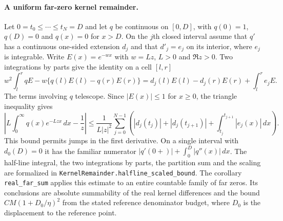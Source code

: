 \paragraph{A uniform far-zero kernel remainder.}
Let $0=t_0\le\cdots\le t_N=D$ and let $q$ be continuous on
$[0,D]$, with $q(0)=1$, $q(D)=0$ and $q(x)=0$ for $x>D$.
On the $j$th closed interval assume that $q'$ has a continuous
one-sided extension $d_j$ and that $d'_j=e_j$ on its interior,
where $e_j$ is integrable. Write $E(x)=e^{-wx}$ with $w=Lz$,
$L>0$ and $\Re z>0$. Two integrations by parts give the identity
on a cell $[l,r]$
\[
 w^2\int_l^r qE-w\{q(l)E(l)-q(r)E(r)\}
   =d_j(l)E(l)-d_j(r)E(r)+\int_l^r e_j E.
\]
The terms involving $q$ telescope. Since $|E(x)|\le1$ for
$x\ge0$, the triangle inequality gives
\[
 \left|L\int_0^\infty q(x)e^{-Lzx}\,dx-\frac1z\right|
 \le \frac1{L|z|^2}
  \sum_{j=0}^{N-1}\left(
       |d_j(t_j)|+|d_j(t_{j+1})|
       +\int_{t_j}^{t_{j+1}}|e_j(x)|\,dx\right).
\]
This bound permits jumps in the first derivative. On a single
interval with $d_0(D)=0$ it has the familiar numerator
$|q'(0+)|+\int_0^D |q''(x)|\,dx$.
The half-line integral, the two integrations by parts, the
partition sum and the scaling are formalized in
\texttt{KernelRemainder.halfline\_scaled\_bound}.
The corollary \texttt{real\_far\_sum} applies this estimate to an
entire countable family of far zeros. Its conclusions are absolute
summability of the real kernel differences and the bound
$C M(1+D_0/\eta)^2$ from the stated reference denominator budget,
where $D_0$ is the displacement to the reference point.
